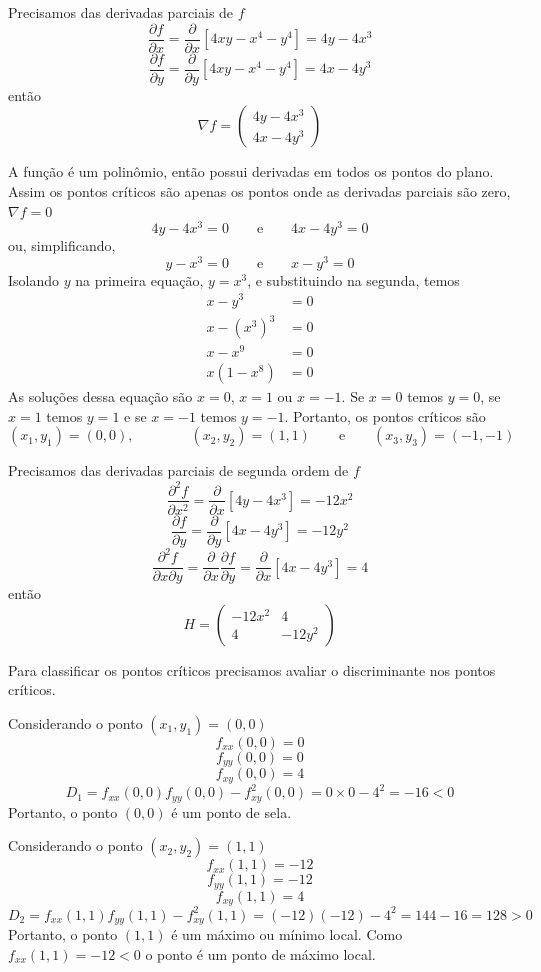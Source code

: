 \documentclass[a4paper,12pt,fleqn]{article}
\newcommand{\D}[2]{\frac{\partial {#1}}{\partial {#2}}}
\newcommand{\DS}[2]{\frac{\partial^2 {#1}}{\partial {#2}^2}}
\newcommand{\DM}[3]{\frac{\partial^2 {#1}}{\partial {#2} \partial {#3}}}
\newcommand{\vetor}[2]{\left(\begin{array}{c} #1 \\ #2 \end{array}\right)}
\begin{document}
\begin{answer}
  Precisamos das derivadas parciais de $f$
  \[
    \D{f}{x}
    = \D{}{x}\left[4xy -x^4 -y^4\right]
    = 4y - 4x^3
  \]
  \[
    \D{f}{y}
    = \D{}{y}\left[4xy -x^4 -y^4\right]
    = 4x -4y^3
  \]
  então
  \[
    \nabla f = \vetor{4y - 4x^3}{4x -4y^3}
  \]

  A função é um polinômio, então possui derivadas em todos os pontos do plano.
  Assim os pontos críticos são apenas os pontos onde as derivadas parciais são zero,
  \(\nabla f = 0\)
  \[
    4y - 4x^3 = 0
    \qquad\text{e}\qquad
    4x -4y^3 = 0
  \]
  ou, simplificando,
  \[
    y - x^3 = 0
    \qquad\text{e}\qquad
    x - y^3 = 0
  \]
  Isolando $y$ na primeira equação, \(y = x^3\), e substituindo na segunda, temos
  \begin{align*}
    x - y^3                & = 0 \\
    x - \left(x^3\right)^3 & = 0 \\
    x -x^9                 & = 0 \\
    x(1 - x^8)             & = 0
  \end{align*}
  As soluções dessa equação são $x=0$, $x=1$ ou $x=-1$.
  Se $x=0$ temos $y=0$,
  se $x=1$ temos $y=1$ e
  se $x=-1$ temos $y=-1$.
  Portanto, os pontos críticos são
  \[
    (x_1, y_1) = (0, 0),
    \qquad\qquad
    (x_2, y_2) = (1, 1)
    \qquad\text{e}\qquad
    (x_3, y_3) = (-1, -1)
  \]

  Precisamos das derivadas parciais de segunda ordem de $f$
  \[
    \DS{f}{x}
    = \D{}{x}\left[4y - 4x^3\right]
    = -12x^2
  \]
  \[
    \D{f}{y}
    = \D{}{y}\left[4x -4y^3\right]
    = -12y^2
  \]
  \[
    \DM{f}{x}{y}
    = \D{}{x}\D{f}{y}
    = \D{}{x}\left[4x -4y^3\right]
    = 4
  \]
  então
  \[
    H = \left(\begin{array}{cc}
      -12x^2 & 4 \\
      4 & -12y^2
    \end{array}\right)
  \]

  Para classificar os pontos críticos precisamos avaliar o discriminante nos
  pontos críticos.

  Considerando o ponto \((x_1, y_1) = (0, 0)\)
  \[
    f_{xx}(0, 0) = 0
  \]
  \[
    f_{yy}(0, 0) = 0
  \]
  \[
    f_{xy}(0, 0) = 4
  \]
  \[
    D_1
    = f_{xx}(0, 0)f_{yy}(0, 0) - f^2_{xy}(0, 0)
    = 0 \times 0 - 4^2
    = -16 < 0
  \]
  Portanto, o ponto $(0, 0)$ é um ponto de sela.

  Considerando o ponto \((x_2, y_2) = (1, 1)\)
  \[
    f_{xx}(1, 1) = -12
  \]
  \[
    f_{yy}(1, 1) = -12
  \]
  \[
    f_{xy}(1, 1) = 4
  \]
  \[
    D_2
    = f_{xx}(1, 1)f_{yy}(1, 1) - f^2_{xy}(1, 1)
    = (-12)(-12) - 4^2
    = 144 -16
    = 128 > 0
  \]
  Portanto, o ponto $(1, 1)$ é um máximo ou mínimo local. Como \(f_{xx}(1, 1) = -12 < 0\)
  o ponto é um ponto de máximo local.


\end{answer}
\end{document}
